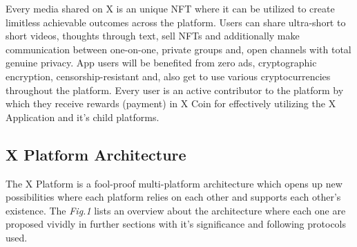 \documentclass[letterpaper,11pt]{article}
\begin{document}
Every media shared on X is an unique NFT where it can be utilized to create limitless achievable outcomes across the platform. Users can share ultra-short to short videos, thoughts through text, sell NFTs and additionally make communication between one-on-one, private groups and, open channels with total genuine privacy. App users will be benefited from zero ads, cryptographic encryption, censorship-resistant and, also get to use various cryptocurrencies throughout the platform. Every user is an active contributor to the platform by which they receive rewards (payment) in X Coin for effectively utilizing the X Application and it's child platforms.\\


\subsection{\textbf{X Platform Architecture}}

The X Platform is a fool-proof multi-platform architecture which opens up new possibilities where each platform relies on each other and supports each other's existence. The \textit{Fig.1} lists an overview about the architecture where each one are proposed vividly in further sections with it's significance and following protocols used.\\
\end{document}
